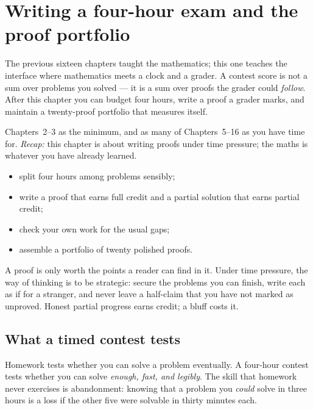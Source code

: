 \chapter{Writing a four-hour exam and the proof portfolio}

The previous sixteen chapters taught the mathematics; this one teaches
the interface where mathematics meets a clock and a grader. A contest
score is not a sum over problems you solved --- it is a sum over proofs
the grader could \emph{follow}. After this chapter you can budget four
hours, write a proof a grader marks, and maintain a twenty-proof
portfolio that measures itself.

\begin{rulebox}
Chapters~2--3 as the minimum, and as many of Chapters~5--16 as you have time for. \emph{Recap:} this chapter is about writing proofs under time pressure; the maths is whatever you have already learned.
\end{rulebox}
\begin{wins}
\begin{itemize}
\item split four hours among problems sensibly;
\item write a proof that earns full credit and a partial solution that earns partial credit;
\item check your own work for the usual gaps;
\item assemble a portfolio of twenty polished proofs.
\end{itemize}
\end{wins}
\begin{principle}
A proof is only worth the points a reader can find in it. Under time pressure, the way of thinking is to be strategic: secure the problems you can finish, write each as if for a stranger, and never leave a half-claim that you have not marked as unproved. Honest partial progress earns credit; a bluff costs it.
\end{principle}

\section{What a timed contest tests}
Homework tests whether you can solve a problem eventually. A four-hour
contest tests whether you can solve \emph{enough, fast, and legibly}.
The skill that homework never exercises is abandonment: knowing that a
problem you \emph{could} solve in three hours is a loss if the other
five were solvable in thirty minutes each.

